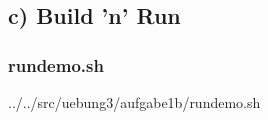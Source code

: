 \subsection*{c) Build 'n' Run}
\subsubsection*{rundemo.sh}


{../../src/uebung3/aufgabe1b/rundemo.sh}
